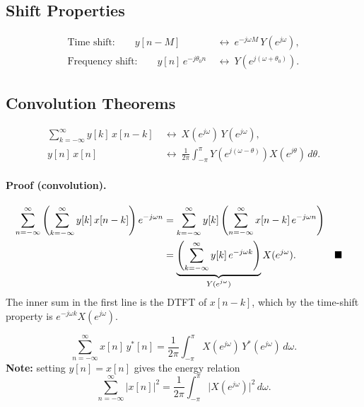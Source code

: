 \documentclass[handout_subfiles_root.tex]{subfiles}
\begin{document}
\subsection{Shift Properties}

\begin{factbox}[title={Property}]
\begin{align*}
\text{Time shift:}\qquad y[n-M] &\ \longleftrightarrow\ e^{-j\omega M}\,Y(e^{j\omega}), \\
\text{Frequency shift:}\qquad y[n]\,e^{-j\theta_0 n} &\ \longleftrightarrow\ Y\!\left(e^{j(\omega+\theta_0)}\right).
\end{align*}
\end{factbox}

\subsection{Convolution Theorems}

\begin{factbox}[title={Property}]
\begin{align*}
\sum_{k=-\infty}^{\infty} y[k]\,x[n-k] &\ \longleftrightarrow\ X(e^{j\omega})\,Y(e^{j\omega}), \\
y[n]\,x[n] &\ \longleftrightarrow\ \frac{1}{2\pi}\int_{-\pi}^{\pi} Y\!\left(e^{j(\omega-\theta)}\right)X(e^{j\theta})\,d\theta.
\end{align*}
\end{factbox}

\paragraph{Proof (convolution).}
\begin{align*}
\sum_{n=-\infty}^{\infty}\left(\sum_{k=-\infty}^{\infty} y[k]\,x[n-k]\right)e^{-j\omega n}
&= \sum_{k=-\infty}^{\infty} y[k]\left(\sum_{n=-\infty}^{\infty} x[n-k]\,e^{-j\omega n}\right) \\
&= \underbrace{\left(\sum_{k=-\infty}^{\infty} y[k]\,e^{-j\omega k}\right)}_{\HandoutUnderbraceLabel{Y(e^{j\omega})}} X(e^{j\omega}). && \HandoutQEDalign
\end{align*}
The inner sum in the first line is the DTFT of $x[n-k]$, which by the time-shift property is $e^{-j\omega k}X(e^{j\omega})$.


\begin{factbox}[title={Property}]
\begin{equation*}
\sum_{n=-\infty}^{\infty} x[n]\,y^*[n] = \frac{1}{2\pi}\int_{-\pi}^{\pi} X(e^{j\omega})\,Y^*(e^{j\omega})\,d\omega.
\end{equation*}
\textbf{Note:} setting $y[n]=x[n]$ gives the energy relation
\begin{equation*}
\sum_{n=-\infty}^{\infty} |x[n]|^2 = \frac{1}{2\pi}\int_{-\pi}^{\pi} \big|X(e^{j\omega})\big|^2\,d\omega.
\end{equation*}
\end{factbox}
\end{document}
